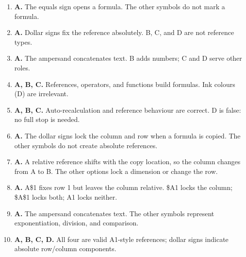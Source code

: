 \begin{enumerate}[label=\textbf{Q\arabic*.}, leftmargin=*]
\item \textbf{A.} The equals sign opens a formula. The other symbols do not mark a formula.
\item \textbf{A.} Dollar signs fix the reference absolutely. B, C, and D are not reference types.
\item \textbf{A.} The ampersand concatenates text. B adds numbers; C and D serve other roles.
\item \textbf{A, B, C.} References, operators, and functions build formulas. Ink colours (D) are irrelevant.
\item \textbf{A, B, C.} Auto-recalculation and reference behaviour are correct. D is false: no full stop is needed.
\item \textbf{A.} The dollar signs lock the column and row when a formula is copied. The other symbols do not create absolute references.

\item \textbf{A.} A relative reference shifts with the copy location, so the column changes from A to B. The other options lock a dimension or change the row.

\item \textbf{A.} A\$1 fixes row 1 but leaves the column relative. \$A1 locks the column; \$A\$1 locks both; A1 locks neither.

\item \textbf{A.} The ampersand concatenates text. The other symbols represent exponentiation, division, and comparison.

\item \textbf{A, B, C, D.} All four are valid A1-style references; dollar signs indicate absolute row/column components.

\end{enumerate}
